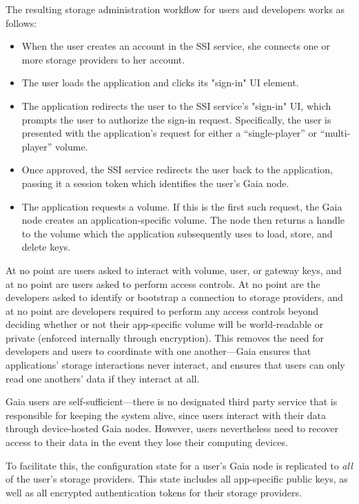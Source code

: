 The resulting storage administration workflow for users and developers works as
follows:
\begin{itemize}
   \item When the user creates an account in the SSI service, she connects one
      or more storage providers to her account.
   \item The user loads the application and clicks its "sign-in" UI element.
   \item The application redirects the user to the SSI service's "sign-in" UI,
      which prompts the user to authorize the sign-in request.  Specifically,
      the user is presented with the application's request for either a
      ``single-player'' or ``multi-player'' volume.
   \item Once approved, the SSI service redirects the user back to the
      application, passing it a session token which identifies the user's Gaia
      node.
   \item The application requests a volume.  If this is the first such request,
      the Gaia node creates an application-specific volume.  The node then
      returns a handle to the volume which the application subsequently uses to
      load, store, and delete keys.
\end{itemize}

At no point are users asked to interact with volume, user, or gateway keys, and at no point
are users asked to perform access controls.  At no point are the developers
asked to identify or bootstrap a connection to storage providers, and at no
point are developers required to perform any access controls beyond deciding
whether or not their app-specific volume will be world-readable or private
(enforced internally through encryption).  This removes the need for developers
and users to coordinate with one another---Gaia ensures that applications' storage
interactions never interact, and ensures that users can only read one anothers'
data if they interact at all.

Gaia users are self-sufficient---there is no designated third party service that is
responsible for keeping the system alive, since users interact with their data
through device-hosted Gaia nodes.  However, users nevertheless need to recover
access to their data in the event they lose their computing devices.

To facilitate this, the configuration state for a user's Gaia node is replicated to \textit{all} of
the user's storage providers.  This state includes all app-specific public keys,
as well as all encrypted authentication tokens for their storage providers.

